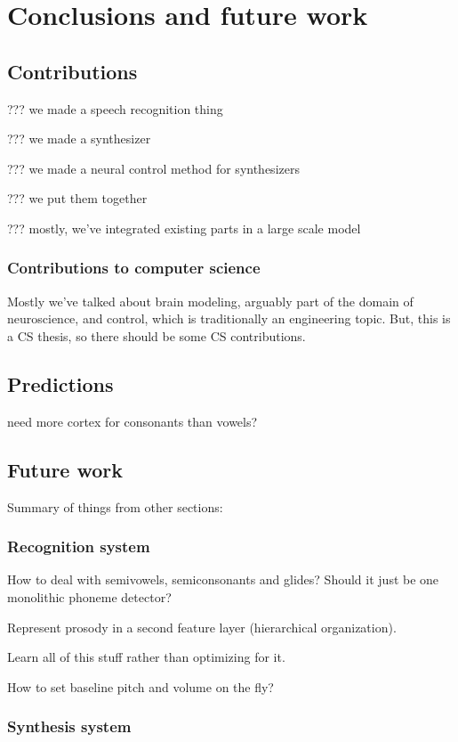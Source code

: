 \chapter{Conclusions and future work}



\section{Contributions}

??? we made a speech recognition thing

??? we made a synthesizer

??? we made a neural control method for synthesizers

??? we put them together

??? mostly, we've integrated existing parts in a large scale model

\subsection{Contributions to computer science}

Mostly we've talked about brain modeling,
arguably part of the domain of neuroscience,
and control, which is traditionally an engineering topic.
But, this is a CS thesis, so there should be some CS contributions.

\section{Predictions}

need more cortex for consonants than vowels?

\section{Future work}

Summary of things from other sections:

\subsection{Recognition system}

How to deal with semivowels, semiconsonants and glides?
Should it just be one monolithic phoneme detector?

Represent prosody in a second feature layer (hierarchical organization).

Learn all of this stuff rather than optimizing for it.

How to set baseline pitch and volume on the fly?

\subsection{Synthesis system}
